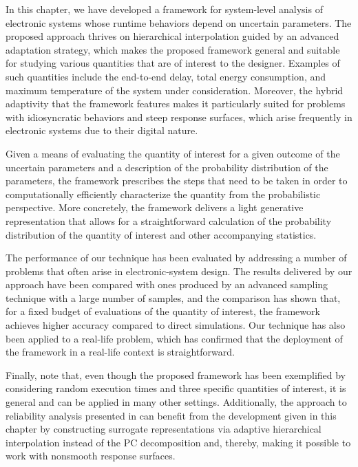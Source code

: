 In this chapter, we have developed a framework for system-level analysis of
electronic systems whose runtime behaviors depend on uncertain parameters. The
proposed approach thrives on hierarchical interpolation guided by an advanced
adaptation strategy, which makes the proposed framework general and suitable for
studying various quantities that are of interest to the designer. Examples of
such quantities include the end-to-end delay, total energy consumption, and
maximum temperature of the system under consideration. Moreover, the hybrid
adaptivity that the framework features makes it particularly suited for problems
with idiosyncratic behaviors and steep response surfaces, which arise frequently
in electronic systems due to their digital nature.

Given a means of evaluating the quantity of interest for a given outcome of the
uncertain parameters and a description of the probability distribution of the
parameters, the framework prescribes the steps that need to be taken in order to
computationally efficiently characterize the quantity from the probabilistic
perspective. More concretely, the framework delivers a light generative
representation that allows for a straightforward calculation of the probability
distribution of the quantity of interest and other accompanying statistics.

The performance of our technique has been evaluated by addressing a number of
problems that often arise in electronic-system design. The results delivered by
our approach have been compared with ones produced by an advanced sampling
technique with a large number of samples, and the comparison has shown that, for
a fixed budget of evaluations of the quantity of interest, the framework
achieves higher accuracy compared to direct simulations. Our technique has also
been applied to a real-life problem, which has confirmed that the deployment of
the framework in a real-life context is straightforward.

Finally, note that, even though the proposed framework has been exemplified by
considering random execution times and three specific quantities of interest, it
is general and can be applied in many other settings. Additionally, the approach
to reliability analysis presented in  can
benefit from the development given in this chapter by constructing surrogate
representations via adaptive hierarchical interpolation instead of the \ac{PC}
decomposition and, thereby, making it possible to work with nonsmooth response
surfaces.

